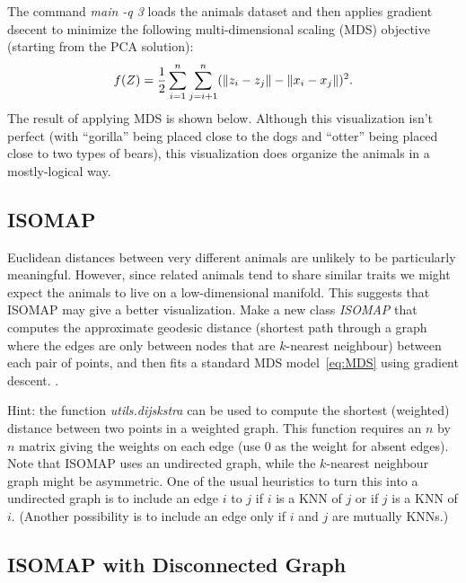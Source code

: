 \documentclass{article}
\begin{document}
The command \emph{main -q 3} loads the animals dataset and then applies gradient dsecent to minimize the following multi-dimensional scaling (MDS) objective (starting from the PCA solution):
\begin{equation}
\label{eq:MDS}
f(Z) =  \frac{1}{2}\sum_{i=1}^n\sum_{j=i+1}^n (  \|z_i - z_j\| - \|x_i - x_j\|)^2.
\end{equation}
 The result of applying MDS is shown below.
Although this visualization isn't perfect (with ``gorilla'' being placed close to the dogs and ``otter'' being placed close to two types of bears), this visualization does organize the animals in a mostly-logical way.


\subsection{ISOMAP}

Euclidean distances between very different animals are unlikely to be particularly meaningful. However, since related animals tend to share similar traits we might expect the animals to live on a low-dimensional manifold. This suggests that ISOMAP may give a better visualization. 
Make a new class \emph{ISOMAP} that computes the approximate geodesic distance (shortest path through a graph where the edges are only between nodes that are $k$-nearest neighbour) between each pair of points, and then fits a standard MDS model~\eqref{eq:MDS} using gradient descent. .

Hint: the function \emph{utils.dijskstra} can be used to compute the shortest (weighted) distance between two points in a weighted graph. This function requires an $n$ by $n$ matrix giving the weights on each edge (use $0$ as the weight for absent edges). Note that ISOMAP uses an undirected graph, while the $k$-nearest neighbour graph might be asymmetric. One of the usual heuristics to turn this into a undirected graph is to include an edge $i$ to $j$ if $i$ is a KNN of $j$ or if $j$ is a KNN of $i$. (Another possibility is to include an edge only if $i$ and $j$ are mutually KNNs.)

\subsection{ISOMAP with Disconnected Graph}
\end{document}

